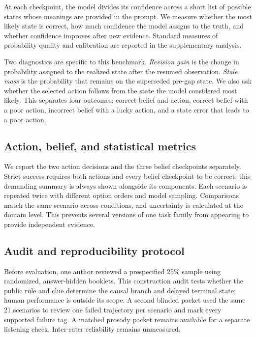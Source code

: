 \documentclass{article}
\begin{document}
At each checkpoint, the model divides its confidence across a short list of possible states whose meanings are provided in the prompt. We measure whether the most likely state is correct, how much confidence the model assigns to the truth, and whether confidence improves after new evidence. Standard measures of probability quality and calibration are reported in the supplementary analysis.

Two diagnostics are specific to this benchmark. \emph{Revision gain} is the change in probability assigned to the realized state after the resumed observation. \emph{Stale mass} is the probability that remains on the superseded pre-gap state. We also ask whether the selected action follows from the state the model considered most likely. This separates four outcomes: correct belief and action, correct belief with a poor action, incorrect belief with a lucky action, and a state error that leads to a poor action.

\subsection{Action, belief, and statistical metrics}

We report the two action decisions and the three belief checkpoints separately. Strict success requires both actions and every belief checkpoint to be correct; this demanding summary is always shown alongside its components. Each scenario is repeated twice with different option orders and model sampling. Comparisons match the same scenario across conditions, and uncertainty is calculated at the domain level. This prevents several versions of one task family from appearing to provide independent evidence.

\subsection{Audit and reproducibility protocol}

Before evaluation, one author reviewed a prespecified 25\% sample using randomized, answer-hidden booklets. This construction audit tests whether the public rule and clue determine the causal branch and delayed terminal state; human performance is outside its scope. A second blinded packet used the same 21 scenarios to review one failed trajectory per scenario and mark every supported failure tag. A matched prosody packet remains available for a separate listening check. Inter-rater reliability remains unmeasured.
\end{document}
